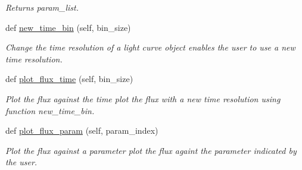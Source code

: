 \begin{DoxyCompactItemize}
\begin{DoxyCompactList}\small\item\em Returns param\+\_\+list. \end{DoxyCompactList}\item 
def \hyperlink{classexospec_1_1lc__class_1_1_light_curve_data_ad09684789cb0431662a673f72aef7ac8}{new\+\_\+time\+\_\+bin} (self, bin\+\_\+size)
\begin{DoxyCompactList}\small\item\em Change the time resolution of a light curve object enables the user to use a new time resolution. \end{DoxyCompactList}\item 
def \hyperlink{classexospec_1_1lc__class_1_1_light_curve_data_a3e63540e9bb38ce3415d27527e8c6ba9}{plot\+\_\+flux\+\_\+time} (self, bin\+\_\+size)
\begin{DoxyCompactList}\small\item\em Plot the flux against the time plot the flux with a new time resolution using function new\+\_\+time\+\_\+bin. \end{DoxyCompactList}\item 
def \hyperlink{classexospec_1_1lc__class_1_1_light_curve_data_a917ef7c0956874d2c9c1696c02305ef5}{plot\+\_\+flux\+\_\+param} (self, param\+\_\+index)
\begin{DoxyCompactList}\small\item\em Plot the flux against a parameter plot the flux againt the parameter indicated by the user. \end{DoxyCompactList}\end{DoxyCompactItemize}

